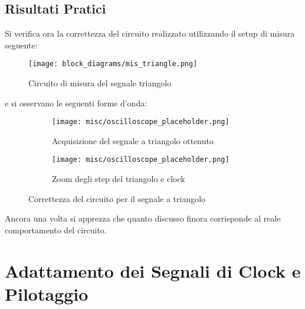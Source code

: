 
\subsection*{Risultati Pratici}


Si verifica ora la correttezza del circuito realizzato utilizzando il setup di misura seguente:

\begin{figure}[H]
    \centering
    \texttt{[image: block\_diagrams/mis\_triangle.png]}
    \caption{Circuito di misura del segnale triangolo}
    \label{mis_triangle}
\end{figure}

e si osservano le seguenti forme d'onda:

\begin{figure}[H]
    \centering

    \begin{subfigure}{.5\textwidth}
        \centering
        \texttt{[image: misc/oscilloscope\_placeholder.png]}
        \caption{Acquisizione del segnale a triangolo ottenuto}
        \label{acq_triangle}
    \end{subfigure}%
    \begin{subfigure}{.5\textwidth}
        \centering
        \texttt{[image: misc/oscilloscope\_placeholder.png]}
        \caption{Zoom degli step del triangolo e clock}
        \label{acq_triangle_steps}
    \end{subfigure}

    \caption{Correttezza del circuito per il segnale a triangolo}
    \label{acq_triangle_signals}
\end{figure}

Ancora una volta si apprezza che quanto discusso finora corrisponde al reale comportamento
del circuito.


\section{Adattamento dei Segnali di Clock e Pilotaggio}


